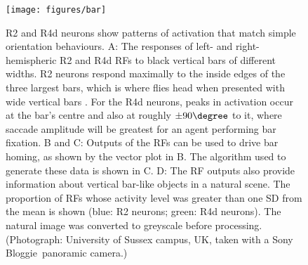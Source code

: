 \begin{figure}
\centering
\texttt{[image: figures/bar]}
\caption{R2 and R4d neurons show patterns of activation that match simple orientation behaviours.
A: The responses of left- and right-hemispheric R2 and R4d \acp{RF} to black vertical bars of different widths.
R2 neurons respond maximally to the inside edges of the three largest bars, which is where flies head when presented with wide vertical bars \protect\cite{Osorio1990}.
For the R4d neurons, peaks in activation occur at the bar's centre and also at roughly $\pm 90\degree$ to it, where saccade amplitude will be greatest for an agent performing bar fixation.
B and C: Outputs of the \acp{RF} can be used to drive bar homing, as shown by the vector plot in B.
The algorithm used to generate these data is shown in C.
D: The \ac{RF} outputs also provide information about vertical bar-like objects in a natural scene.
The proportion of \acp{RF} whose activity level was greater than one SD from the mean is shown (blue: R2 neurons; green: R4d neurons).
The natural image was converted to greyscale before processing.
(Photograph: University of Sussex campus, UK, taken with a Sony Bloggie\texttrademark\ panoramic camera.)}

\label{fig:bar}
\end{figure}
